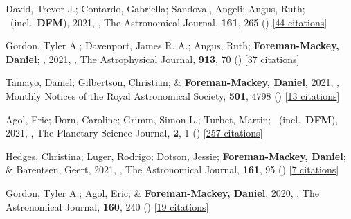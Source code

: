 \item[{\color{numcolor}\scriptsize65}] David, Trevor J.; Contardo, Gabriella; Sandoval, Angeli; Angus, Ruth; \etal\ (incl.\ \textbf{DFM}), 2021, , The Astronomical Journal, \textbf{161}, 265 () [\href{https://ui.adsabs.harvard.edu/abs/2021AJ....161..265D}{44 citations}]

\item[{\color{numcolor}\scriptsize64}] Gordon, Tyler A.; Davenport, James R. A.; Angus, Ruth; \textbf{Foreman-Mackey, Daniel}; \etal, 2021, , The Astrophysical Journal, \textbf{913}, 70 () [\href{https://ui.adsabs.harvard.edu/abs/2021ApJ...913...70G}{37 citations}]

\item[{\color{numcolor}\scriptsize63}] Tamayo, Daniel; Gilbertson, Christian; \& \textbf{Foreman-Mackey, Daniel}, 2021, , Monthly Notices of the Royal Astronomical Society, \textbf{501}, 4798 () [\href{https://ui.adsabs.harvard.edu/abs/2021MNRAS.501.4798T}{13 citations}]

\item[{\color{numcolor}\scriptsize62}] Agol, Eric; Dorn, Caroline; Grimm, Simon L.; Turbet, Martin; \etal\ (incl.\ \textbf{DFM}), 2021, , The Planetary Science Journal, \textbf{2}, 1 () [\href{https://ui.adsabs.harvard.edu/abs/2021PSJ.....2....1A}{257 citations}]

\item[{\color{numcolor}\scriptsize61}] Hedges, Christina; Luger, Rodrigo; Dotson, Jessie; \textbf{Foreman-Mackey, Daniel}; \& Barentsen, Geert, 2021, , The Astronomical Journal, \textbf{161}, 95 () [\href{https://ui.adsabs.harvard.edu/abs/2021AJ....161...95H}{7 citations}]

\item[{\color{numcolor}\scriptsize60}] Gordon, Tyler A.; Agol, Eric; \& \textbf{Foreman-Mackey, Daniel}, 2020, , The Astronomical Journal, \textbf{160}, 240 () [\href{https://ui.adsabs.harvard.edu/abs/2020AJ....160..240G}{19 citations}]


